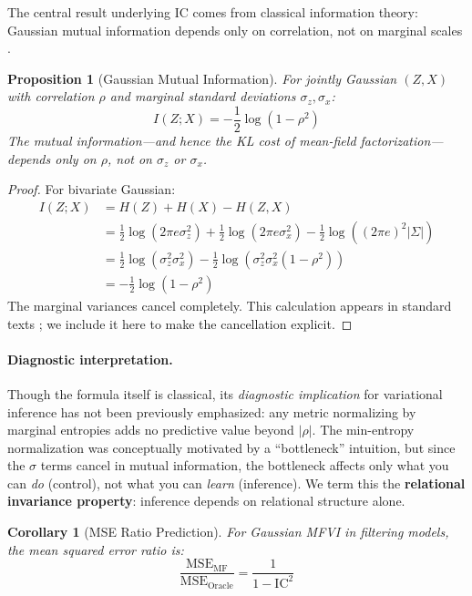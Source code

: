 \documentclass[10pt]{article} %
\theoremstyle{plain}
\newtheorem{proposition}[theorem]{Proposition}
\newtheorem{corollary}[theorem]{Corollary}
\theoremstyle{definition}
\newcommand{\IC}{\mathrm{IC}}  %
\begin{document}
The central result underlying IC comes from classical information theory: Gaussian mutual information depends only on correlation, not on marginal scales \citep{gelfand1959calculation,cover2006elements}.

\begin{proposition}[Gaussian Mutual Information]
\label{prop:gaussian-mi}
For jointly Gaussian $(Z, X)$ with correlation $\rho$ and marginal standard deviations $\sigma_z, \sigma_x$:
\begin{equation}
I(Z; X) = -\frac{1}{2}\log(1 - \rho^2)
\end{equation}
The mutual information---and hence the KL cost of mean-field factorization---depends \emph{only} on $\rho$, not on $\sigma_z$ or $\sigma_x$.
\end{proposition}

\begin{proof}
For bivariate Gaussian:
\begin{align}
I(Z; X) &= H(Z) + H(X) - H(Z, X) \\
&= \frac{1}{2}\log(2\pi e\sigma_z^2) + \frac{1}{2}\log(2\pi e\sigma_x^2) - \frac{1}{2}\log((2\pi e)^2|\Sigma|) \\
&= \frac{1}{2}\log(\sigma_z^2\sigma_x^2) - \frac{1}{2}\log(\sigma_z^2\sigma_x^2(1-\rho^2)) \\
&= -\frac{1}{2}\log(1-\rho^2)
\end{align}
The marginal variances cancel completely. This calculation appears in standard texts \citep{cover2006elements}; we include it here to make the cancellation explicit.
\end{proof}

\paragraph{Diagnostic interpretation.} Though the formula itself is classical, its \emph{diagnostic implication} for variational inference has not been previously emphasized: any metric normalizing by marginal entropies adds no predictive value beyond $|\rho|$. The min-entropy normalization was conceptually motivated by a ``bottleneck'' intuition, but since the $\sigma$ terms cancel in mutual information, the bottleneck affects only what you can \emph{do} (control), not what you can \emph{learn} (inference). We term this the \textbf{relational invariance property}: inference depends on relational structure alone.

\begin{corollary}[MSE Ratio Prediction]
\label{cor:mse-ratio}
For Gaussian MFVI in filtering models, the mean squared error ratio is:
\begin{equation}
\frac{\text{MSE}_{\text{MF}}}{\text{MSE}_{\text{Oracle}}} = \frac{1}{1 - \IC^2}
\label{eq:mse-ratio}
\end{equation}
\end{corollary}
\end{document}
